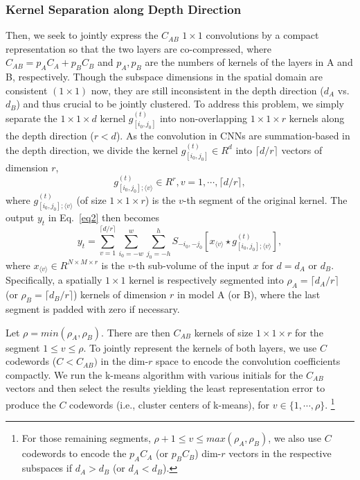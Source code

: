 \documentclass{article}
\begin{document}
	\subsubsection{Kernel Separation along Depth Direction}
	Then, we seek to jointly express the $C_{AB}$ $1 \times 1$ convolutions by a compact representation so that the two layers are co-compressed, where $C_{AB}=p_A C_A+p_B C_B$ and $p_A, p_B$ are the numbers of kernels of the layers in A and B, respectively.
	Though the subspace dimensions in the spatial domain are consistent $(1\times 1)$ now, they are still inconsistent in the depth direction ($d_A$ vs.~$d_B$) and thus crucial to be jointly clustered.
	To address this problem, we simply separate the $1\times 1\times d$ kernel $g_{[i_0,j_0]}^{(t)}$ into non-overlapping $1\times 1\times r$ kernels along the depth direction ($r<d$).
	As the convolution in CNNs are summation-based in the depth direction, we divide the kernel $g_{[i_0,j_0]}^{(t)}\in R^d$ into $\lceil d/r \rceil$ vectors of dimension $r$,
	\begin{equation}
	\label{eq7}
	g_{[i_0,j_0];\langle v \rangle}^{(t)}\in R^r, v=1, \cdots, \lceil d/r \rceil,
	\end{equation}
	where $g_{[i_0,j_0];\langle v \rangle}^{(t)}$ (of size $1\times 1\times r$) is the $v$-th segment of the original kernel.
	The output $y_t$ in Eq.~\ref{eq2} then becomes
	\begin{equation}
	\label{eq8}
	y_t =\sum_{v=1}^{\lceil d/r \rceil}\sum_{i_0=-w}^{w}\sum_{j_0=-h}^{h} S_{-i_0, -j_0}[x_{\langle v \rangle} \star g_{[i_0,j_0];\langle v \rangle}^{(t)}],
	\end{equation}
	where $x_{\langle v \rangle} \in R^{N\times M \times r}$ is the $v$-th %
	sub-volume of the input $x$ for  $d=d_A$ or $d_B$.
	Specifically, a spatially $1\times 1$ kernel is respectively segmented into $\rho_A=\lceil d_A/r \rceil$ (or $\rho_B=\lceil d_B/r \rceil$) kernels of dimension $r$ in model A (or B), where the last segment is padded with zero if necessary.
	
	Let $\rho=min(\rho_A, \rho_B)$.
	There are then $C_{AB}$ kernels of size $1\times 1\times r$ for the segment $1\leq v \leq \rho$.
	To jointly represent the kernels of both layers, we use $C$ codewords ($C<C_{AB})$ in the dim-$r$ space to encode the convolution coefficients compactly.
	We run the k-means algorithm with various initials for the $C_{AB}$ vectors and then select the results yielding the least representation error to produce the $C$ codewords (i.e., cluster centers of k-means), for $v\in \{1,\cdots, \rho\}$.
	\footnote{For those remaining segments, $\rho+1\leq v \leq max(\rho_A,\rho_B)$, we also use $C$ codewords to encode the $p_AC_A$ (or $p_BC_B$) dim-$r$ vectors in the respective subspaces if $d_A>d_B$ (or $d_A<d_B$).}
	
\end{document}
